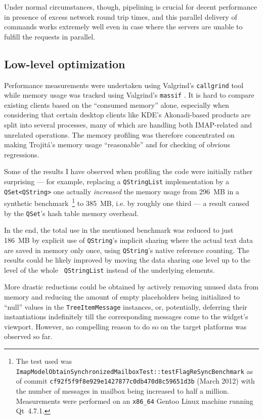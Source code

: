\documentclass[trojita]{subfiles}
\begin{document}
Under normal circumstances, though, pipelining is crucial for decent performance in presence of excess network round
trip times, and this parallel delivery of commands works extremely well even in case where the servers are unable to
fulfill the requests in parallel.

\subsection{Low-level optimization}

Performance measurements were undertaken using Valgrind's \cite{valgrind} {\tt callgrind} \cite{valgrind-callgrind} tool
while memory usage was tracked using Valgrind's {\tt massif} \cite{valgrind-massif}.  It is hard to compare existing
clients based on the ``consumed memory'' alone, especially when considering that certain desktop clients like KDE's
Akonadi-based \cite{akonadi} products are split into several processes, many of which are handling both IMAP-related and
unrelated operations.  The memory profiling was therefore concentrated on making Trojitá's memory usage ``reasonable''
and for checking of obvious regressions.

Some of the results I have observed when profiling the code were initially rather surprising --- for example, replacing
a {\tt QStringList} implementation by a {\tt QSet<QString>} one actually {\em increased} the memory usage from 296~MB in
a synthetic benchmark~\footnote{The test used was {\tt ImapModelObtainSynchronizedMailboxTest::testFlagReSyncBenchmark}
as of commit {\tt cf92f5f9f8e929e1427877c0db470d8c59651d3b} (March 2012) with the number of messages in mailbox being
increased to half a million.  Measurements were performed on an {\tt x86\_64} Gentoo Linux machine running Qt~4.7.1.} to
385~MB, i.e. by roughly one third --- a result caused by the {\tt QSet}'s hash table memory overhead.

In the end, the total use in the mentioned benchmark was reduced to just 186~MB by explicit use of {\tt QString}'s
implicit sharing where the actual text data are saved in memory only once, using {\tt QString}'s native reference
counting.  The results could be likely improved by moving the data sharing one level up to the level of the whole {\tt
QStringList} instead of the underlying elements.

More drastic reductions could be obtained by actively removing unused data from memory and reducing the amount of empty
placeholders being initialized to ``null'' values in the {\tt TreeItemMessage} instances, or, potentially, deferring
their instantiations indefinitely till the corresponding messages come to the widget's viewport.  However, no compelling
reason to do so on the target platforms was observed so far.
\end{document}
